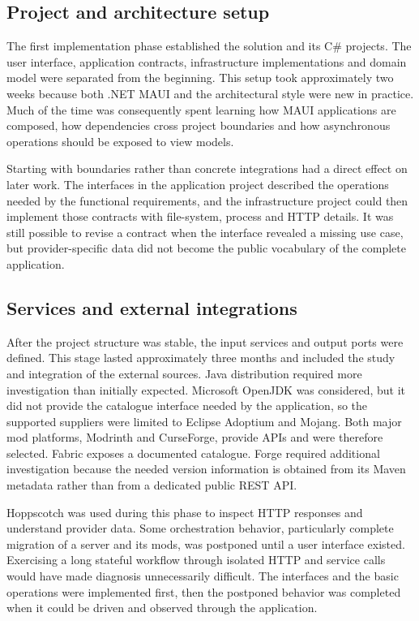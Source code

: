 \subsection{Project and architecture setup}

The first implementation phase established the solution and its C\# projects. The user interface, application contracts, infrastructure implementations and domain model were separated from the beginning. This setup took approximately two weeks because both .NET MAUI and the architectural style were new in practice. Much of the time was consequently spent learning how MAUI applications are composed, how dependencies cross project boundaries and how asynchronous operations should be exposed to view models.

Starting with boundaries rather than concrete integrations had a direct effect on later work. The interfaces in the application project described the operations needed by the functional requirements, and the infrastructure project could then implement those contracts with file-system, process and \acs{HTTP} details. It was still possible to revise a contract when the interface revealed a missing use case, but provider-specific data did not become the public vocabulary of the complete application.

\subsection{Services and external integrations}

After the project structure was stable, the input services and output ports were defined. This stage lasted approximately three months and included the study and integration of the external sources. Java distribution required more investigation than initially expected. Microsoft OpenJDK was considered, but it did not provide the catalogue interface needed by the application, so the supported suppliers were limited to Eclipse Adoptium and Mojang. Both major mod platforms, Modrinth and CurseForge, provide APIs and were therefore selected. Fabric exposes a documented catalogue. Forge required additional investigation because the needed version information is obtained from its Maven metadata rather than from a dedicated public \acs{REST} API.

Hoppscotch was used during this phase to inspect HTTP responses and understand provider data. Some orchestration behavior, particularly complete migration of a server and its mods, was postponed until a user interface existed. Exercising a long stateful workflow through isolated HTTP and service calls would have made diagnosis unnecessarily difficult. The interfaces and the basic operations were implemented first, then the postponed behavior was completed when it could be driven and observed through the application.

